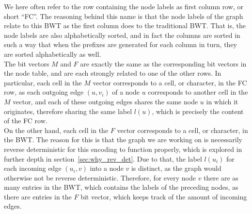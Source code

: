 \documentclass[a4paper,12pt,twoside,BCOR=10mm]{scrbook}
\begin{document}
We here often refer to the row containing the node labels as first column row, or short “FC”. 
The reasoning behind this name is that the node labels of the graph relate to this BWT as the first column 
does to the traditional BWT. 
That is, the node labels are also alphabetically sorted, and in fact the columns are sorted in such a 
way that when the prefixes are generated for each column in turn, they are sorted alphabetically as well. \\
The bit vectors $ M $ and $ F $ are exactly the same as the corresponding bit vectors in the node table, 
and are each strongly related to one of the other rows. 
In particular, each cell in the $ M $ vector corresponds to a cell, or character, in the FC row, 
as each outgoing edge $ (u, v_i) $ of a node $ u $ corresponds to another cell in the $ M $ vector, and each 
of these outgoing edges shares the same node $ u $ in which it originates, therefore sharing the same label $ l ( u ) $, 
which is precisely the content of the FC row. \\
On the other hand, each cell in the $ F $ vector corresponds to a cell, or character, in the BWT. 
The reason for this is that the graph we are working on is necessarily reverse deterministic 
for this encoding to function properly, which is explored in further depth in section~\ref{sec:why_rev_det}. 
Due to that, the label $ l (u_i) $ for each incoming edge $ (u_i, v) $ into a node $ v $ is distinct, 
as the graph would otherwise not be reverse deterministic. 
Therefore, for every node $ v $ there are as many entries in the BWT, which contains the labels of the preceding nodes, 
as there are entries in the $ F $ bit vector, which keeps track of the amount of incoming edges.
\end{document}
